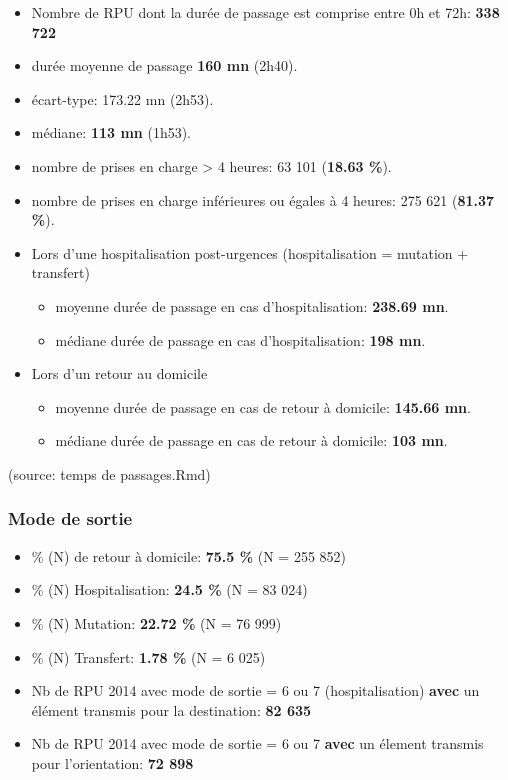 \documentclass[]{article}
\begin{document}
\begin{itemize}
\item
  Nombre de RPU dont la durée de passage est comprise entre 0h et 72h:
  \textbf{338 722}
\item
  durée moyenne de passage \textbf{160 mn} (2h40).
\item
  écart-type: 173.22 mn (2h53).
\item
  médiane: \textbf{113 mn} (1h53).
\item
  nombre de prises en charge \textgreater{} 4 heures: 63 101
  (\textbf{18.63 \%}).
\item
  nombre de prises en charge inférieures ou égales à 4 heures: 275 621
  (\textbf{81.37 \%}).
\item
  Lors d'une hospitalisation post-urgences (hospitalisation = mutation +
  transfert)

  \begin{itemize}
  \itemsep1pt\parskip0pt
  \item
    moyenne durée de passage en cas d'hospitalisation: \textbf{238.69
    mn}.
  \item
    médiane durée de passage en cas d'hospitalisation: \textbf{198 mn}.
  \end{itemize}
\item
  Lors d'un retour au domicile

  \begin{itemize}
  \itemsep1pt\parskip0pt
  \item
    moyenne durée de passage en cas de retour à domicile: \textbf{145.66
    mn}.
  \item
    médiane durée de passage en cas de retour à domicile: \textbf{103
    mn}.
  \end{itemize}
\end{itemize}

(source: temps de passages.Rmd)

\subsubsection{Mode de sortie}\label{mode-de-sortie}

\begin{itemize}
\itemsep1pt\parskip0pt
\item
  \% (N) de retour à domicile: \textbf{75.5 \%} (N = 255 852)
\item
  \% (N) Hospitalisation: \textbf{24.5 \%} (N = 83 024)
\item
  \% (N) Mutation: \textbf{22.72 \%} (N = 76 999)
\item
  \% (N) Transfert: \textbf{1.78 \%} (N = 6 025)
\item
  Nb de RPU 2014 avec mode de sortie = 6 ou 7 (hospitalisation)
  \textbf{avec} un élément transmis pour la destination: \textbf{82 635}
\item
  Nb de RPU 2014 avec mode de sortie = 6 ou 7 \textbf{avec} un élement
  transmis pour l'orientation: \textbf{72 898}
\end{itemize}
\end{document}
